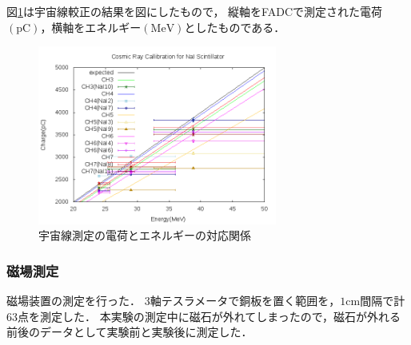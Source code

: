 図\ref{cali}は宇宙線較正の結果を図にしたもので，
縦軸をFADCで測定された電荷$(\mathrm{pC})$，横軸をエネルギー$(\mathrm{MeV})$としたものである．
\begin{figure}[H]
  \centering
      \includegraphics[width=0.7\textwidth]{figure/tajima/fit.png}
      \caption{宇宙線測定の電荷とエネルギーの対応関係}\label{cali}
\end{figure}
\newpage
\subsubsection{磁場測定}
磁場装置の測定を行った．
3軸テスラメータで銅板を置く範囲を，$1\mathrm{cm}$間隔で計63点を測定した．
本実験の測定中に磁石が外れてしまったので，磁石が外れる前後のデータとして実験前と実験後に測定した．

